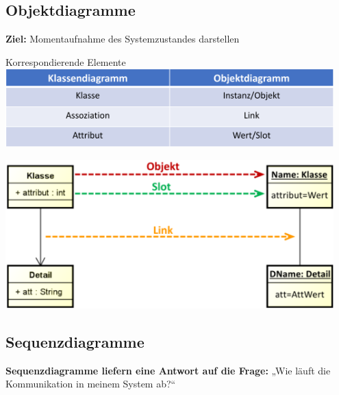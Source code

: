 \documentclass[11pt, a4paper]{article}
\begin{document}
\vspace{10em}




\raggedright \subsection{Objektdiagramme}

\textbf{Ziel:} Momentaufnahme des Systemzustandes darstellen

\vspace{2em}

\begin{minipage}[h]{0.45\textwidth}
    \tiny \centering Korrespondierende Elemente \\
    \vspace{1em}
    \centering \includegraphics[width=0.95\textwidth]{Objekt-00.png}
\end{minipage}
\begin{minipage}[h]{0.45\textwidth}
    \centering \includegraphics[width=0.95\textwidth]{Objekt-01.png}
\end{minipage}




\newpage










\raggedright \subsection{Sequenzdiagramme}


\textbf{Sequenzdiagramme liefern eine Antwort auf die Frage:} „Wie läuft die Kommunikation in meinem System ab?“
\end{document}
